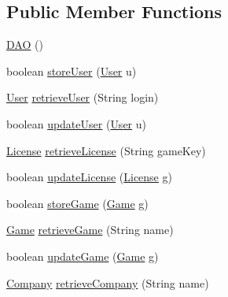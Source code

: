 \subsection*{Public Member Functions}
\begin{DoxyCompactItemize}
\item 
\hyperlink{classes_1_1deusto_1_1server_1_1db_1_1dao_1_1_d_a_o_a1f12a4ca454651d41896e45c42db8f90}{D\+AO} ()
\item 
boolean \hyperlink{classes_1_1deusto_1_1server_1_1db_1_1dao_1_1_d_a_o_acb146e96959c340ef828ef8e36b4283c}{store\+User} (\hyperlink{classes_1_1deusto_1_1server_1_1db_1_1data_1_1_user}{User} u)
\item 
\hyperlink{classes_1_1deusto_1_1server_1_1db_1_1data_1_1_user}{User} \hyperlink{classes_1_1deusto_1_1server_1_1db_1_1dao_1_1_d_a_o_a8c316b4c3bf246d00fb2b423a603ebe6}{retrieve\+User} (String login)
\item 
boolean \hyperlink{classes_1_1deusto_1_1server_1_1db_1_1dao_1_1_d_a_o_a7f6ed77294fe1f61cbebbea410cef6e0}{update\+User} (\hyperlink{classes_1_1deusto_1_1server_1_1db_1_1data_1_1_user}{User} u)
\item 
\hyperlink{classes_1_1deusto_1_1server_1_1db_1_1data_1_1_license}{License} \hyperlink{classes_1_1deusto_1_1server_1_1db_1_1dao_1_1_d_a_o_a02fd634e6bd7a087b1476ab161af646f}{retrieve\+License} (String game\+Key)
\item 
boolean \hyperlink{classes_1_1deusto_1_1server_1_1db_1_1dao_1_1_d_a_o_a98774e8d93cdd4d8d104a197bd37d4e1}{update\+License} (\hyperlink{classes_1_1deusto_1_1server_1_1db_1_1data_1_1_license}{License} g)
\item 
boolean \hyperlink{classes_1_1deusto_1_1server_1_1db_1_1dao_1_1_d_a_o_a7484309d9b9b39c24cd7d0413a90c468}{store\+Game} (\hyperlink{classes_1_1deusto_1_1server_1_1db_1_1data_1_1_game}{Game} g)
\item 
\hyperlink{classes_1_1deusto_1_1server_1_1db_1_1data_1_1_game}{Game} \hyperlink{classes_1_1deusto_1_1server_1_1db_1_1dao_1_1_d_a_o_ac94a91d3e5aeeb98fc12f087532b3506}{retrieve\+Game} (String name)
\item 
boolean \hyperlink{classes_1_1deusto_1_1server_1_1db_1_1dao_1_1_d_a_o_ae7540010b43f96c5e50995a8376614e7}{update\+Game} (\hyperlink{classes_1_1deusto_1_1server_1_1db_1_1data_1_1_game}{Game} g)
\item 
\hyperlink{classes_1_1deusto_1_1server_1_1db_1_1data_1_1_company}{Company} \hyperlink{classes_1_1deusto_1_1server_1_1db_1_1dao_1_1_d_a_o_aabd374b169473cfd6e1bdc4efc89b177}{retrieve\+Company} (String name)

\end{DoxyCompactItemize}

